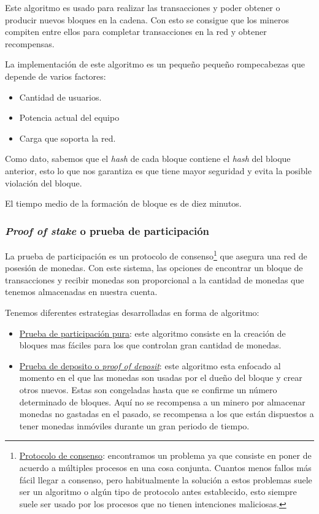 Este algoritmo es usado para realizar las transacciones y poder obtener o producir nuevos bloques en la cadena. Con esto se consigue que los mineros compiten entre ellos para completar transacciones en la red y obtener recompensas.

La implementación de este algoritmo es un pequeño pequeño rompecabezas que depende de varios factores: 
\begin{itemize}
	\item Cantidad de usuarios.
	\item Potencia actual del equipo
	\item Carga que soporta la red.
\end{itemize}

Como dato, sabemos que el \textit{hash} de cada bloque contiene el \textit{hash} del bloque anterior, esto lo que nos garantiza es que tiene mayor seguridad y evita la posible violación del bloque.


El tiempo medio de la formación de bloque es de diez minutos.

\subsubsection{\textit{Proof of stake} o prueba de participación}

La prueba de participación\cite{pos} es un protocolo de consenso\footnote{\underline{Protocolo de consenso}: encontramos un problema ya que consiste en poner de acuerdo a múltiples procesos en una cosa conjunta. Cuantos menos fallos más fácil llegar a consenso, pero habitualmente la solución a estos problemas suele ser un algoritmo o algún tipo de protocolo antes establecido, esto siempre suele ser usado por los procesos que no tienen intenciones maliciosas.} que asegura una red de posesión de monedas. Con este sistema, las opciones de encontrar un bloque de transacciones y recibir monedas son proporcional a la cantidad de monedas que tenemos almacenadas en nuestra cuenta.

Tenemos diferentes estrategias desarrolladas en forma de algoritmo:

\begin{itemize}
	\item \underline{Prueba de participación pura}: este algoritmo consiste en la creación de bloques mas fáciles para los que controlan gran cantidad de monedas. 
	\item \underline{Prueba de deposito o \textit{proof of deposit}}: este algoritmo esta enfocado al momento en el que las monedas son usadas por el dueño del bloque y crear otros nuevos. Estas son congeladas hasta que se confirme un número determinado de bloques. Aquí no se recompensa a un minero por almacenar monedas no gastadas en el pasado, se recompensa a los que están dispuestos a tener monedas inmóviles durante un gran periodo de tiempo.
\end{itemize}


